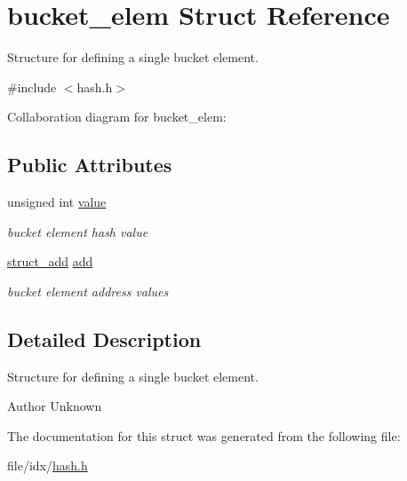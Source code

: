 \hypertarget{structbucket__elem}{\section{bucket\+\_\+elem Struct Reference}
\label{structbucket__elem}
}


Structure for defining a single bucket element.  




{\ttfamily \#include $<$hash.\+h$>$}



Collaboration diagram for bucket\+\_\+elem\+:
\subsection*{Public Attributes}
\begin{DoxyCompactItemize}
\item 
\hypertarget{structbucket__elem_acba8382505705bf798600c054f71310d}{unsigned int \hyperlink{structbucket__elem_acba8382505705bf798600c054f71310d}{value}}\label{structbucket__elem_acba8382505705bf798600c054f71310d}

\begin{DoxyCompactList}\small\item\em bucket element hash value \end{DoxyCompactList}\item 
\hypertarget{structbucket__elem_a07ad9eddc7a5bd1ebff68bbee97f075d}{\hyperlink{structstruct__add}{struct\+\_\+add} \hyperlink{structbucket__elem_a07ad9eddc7a5bd1ebff68bbee97f075d}{add}}\label{structbucket__elem_a07ad9eddc7a5bd1ebff68bbee97f075d}

\begin{DoxyCompactList}\small\item\em bucket element address values \end{DoxyCompactList}\end{DoxyCompactItemize}


\subsection{Detailed Description}
Structure for defining a single bucket element. 

\begin{DoxyAuthor}{Author}
Unknown 
\end{DoxyAuthor}


The documentation for this struct was generated from the following file\+:\begin{DoxyCompactItemize}
\item 
file/idx/\hyperlink{hash_8h}{hash.\+h}\end{DoxyCompactItemize}

